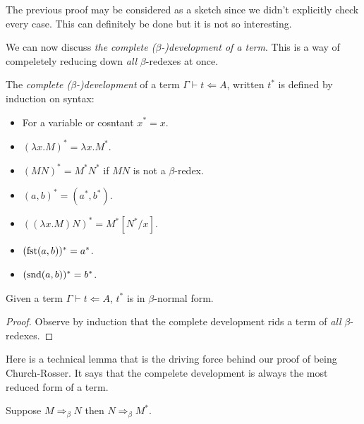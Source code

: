 \begin{remark}
    The previous proof may be considered as a sketch since we didn't explicitly check every case. This can definitely be done but it is not so interesting.
\end{remark}

We can now discuss \emph{the complete ($\beta$-)development of a term}. This is a way of compeletely reducing down \emph{all} $\beta$-redexes at once.

\begin{defin}
    The \emph{complete ($\beta$-)development} of a term $\Gamma \vdash t \Leftarrow A$, written $t^*$ is defined by induction on syntax:
    \begin{itemize}
        \item For a variable or cosntant $x^* = x$.
        \item $(\lambda x . M)^* = \lambda x . M^*$.
        \item $(M N)^* = M^* N^*$ if $MN$ is not a $\beta$-redex.
        \item $(a, b)^* = (a^*, b^*)$.
        \item $((\lambda x . M)N)^* = M^* [N^* / x]$.
        \item $(\mathrm{fst} (a, b))^* = a^*$.
        \item $(\mathrm{snd} (a, b))^* = b^*$.
    \end{itemize}
\end{defin}

\begin{lemma}
    Given a term $\Gamma \vdash t \Leftarrow A$, $t^*$ is in $\beta$-normal form.
\end{lemma}

\begin{proof}
    Observe by induction that the complete development rids a term of \emph{all} $\beta$-redexes.
\end{proof}


Here is a technical lemma that is the driving force behind our proof of being Church-Rosser. It says that the compelete development is always the most reduced form of a term.

\begin{lemma}\label{cd_lemma_beta}
    Suppose $M \Rightarrow_\beta N$ then $N \Rightarrow_\beta M^*$.
\end{lemma}

